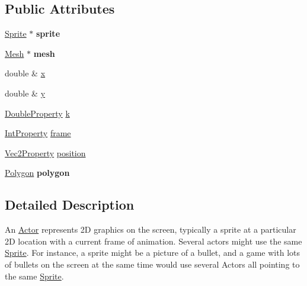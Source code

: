 \subsection*{Public Attributes}
\begin{DoxyCompactItemize}
\item 
\hypertarget{classg2c_1_1_actor_a8c539cd4fa278028f6c9db0e42027de6}{
\hyperlink{classg2c_1_1_sprite}{Sprite} $\ast$ {\bfseries sprite}}
\label{classg2c_1_1_actor_a8c539cd4fa278028f6c9db0e42027de6}

\item 
\hypertarget{classg2c_1_1_actor_a081ed2c7b4394e3c44284887ce9242d3}{
\hyperlink{classg2c_1_1_mesh}{Mesh} $\ast$ {\bfseries mesh}}
\label{classg2c_1_1_actor_a081ed2c7b4394e3c44284887ce9242d3}

\item 
double \& \hyperlink{classg2c_1_1_actor_aebf317d39fb7bf28c061741bd927f81f}{x}
\item 
double \& \hyperlink{classg2c_1_1_actor_ae627fd6cc00197b7e0a0b05d1d93b350}{y}
\item 
\hyperlink{classg2c_1_1_double_property}{DoubleProperty} \hyperlink{classg2c_1_1_actor_ab180e437af1643b93944397b5c1bc02f}{k}
\item 
\hyperlink{classg2c_1_1_int_property}{IntProperty} \hyperlink{classg2c_1_1_actor_a2b162d082f8f5e60463a4da42e9c58fd}{frame}
\item 
\hyperlink{classg2c_1_1_vec2_property}{Vec2Property} \hyperlink{classg2c_1_1_actor_aa674ee18247cbd0c2b908beb8496b71f}{position}
\item 
\hypertarget{classg2c_1_1_actor_a54a2f290b3e7ac35c98f170b961a9a4f}{
\hyperlink{classg2c_1_1_polygon}{Polygon} {\bfseries polygon}}
\label{classg2c_1_1_actor_a54a2f290b3e7ac35c98f170b961a9a4f}

\end{DoxyCompactItemize}


\subsection{Detailed Description}
An \hyperlink{classg2c_1_1_actor}{Actor} represents 2D graphics on the screen, typically a sprite at a particular 2D location with a current frame of animation. Several actors might use the same \hyperlink{classg2c_1_1_sprite}{Sprite}. For instance, a sprite might be a picture of a bullet, and a game with lots of bullets on the screen at the same time would use several Actors all pointing to the same \hyperlink{classg2c_1_1_sprite}{Sprite}.

